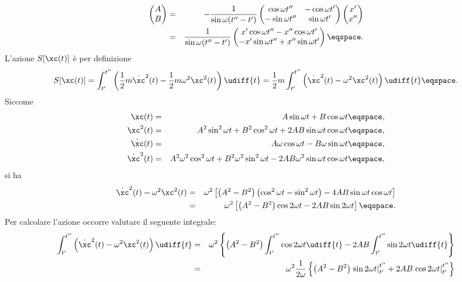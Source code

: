 \begin{eqnarray*}
\begin{pmatrix} A\\B\end{pmatrix} &=& -
\frac{1}{\sin \omega(t''-t')} 
\begin{pmatrix} \cos \omega t'' & - \cos \omega
t' \\ -\sin \omega t'' & \sin \omega t' \end{pmatrix}  \begin{pmatrix} x' \\ x''
\end{pmatrix} \\
&=&
\frac{1}{\sin \omega(t''-t')} 
\begin{pmatrix} 
x' \cos \omega t'' -x'' \cos \omega t' \\
-x' \sin \omega t'' + x'' \sin \omega t'  
\end{pmatrix} \eqspace .
\end{eqnarray*}
L'azione $S[\xc(t)]$ \`e per definizione
\begin{displaymath}
S[\xc(t)] = \int_{t'}^{t''} \left( \frac{1}{2}m \dot{\xc}^{2} (t) - \frac{1}{2}
m \omega^{2}  \xc^{2}(t) \right) \udiff{t} = \frac{1}{2} m \int_{t'}^{t''}
\left( \dot{\xc}^{2} (t) - \omega^{2} \xc^{2}(t) \right) \udiff{t} \eqspace .
\end{displaymath}
Siccome
\begin{eqnarray*}
\xc(t) &=& A \sin \omega t + B \cos \omega t \eqspace, \\
\xc^{2} (t) &=& A^{2} \sin^{2} \omega t + B^{2} \cos^{2} \omega t + 2 A B \sin
\omega  t \cos \omega t \eqspace , \\
\dot{\xc} (t) &=& A \omega \cos \omega t - B \omega \sin \omega t \eqspace, \\
\dot{\xc}^{2}(t) &=& 
A^{2} \omega^{2} \cos^{2} \omega t + B^{2} \omega^{2} \sin^{2} \omega t - 2 AB
\omega^{2} \sin\omega t \cos \omega t  \eqspace, 
\end{eqnarray*}
si ha
\begin{eqnarray*}
\dot{\xc}^{2} (t) - \omega^{2} \xc^{2}(t) 
&=& \omega^{2} \left[ \left( A^{2} - B^{2} \right) \left( \cos^{2} \omega t -
\sin^{2} \omega t \right) - 4 A B \sin \omega t \cos \omega t \right] \\
&=& \omega^{2} \left[ \left( A^{2} - B^{2} \right) \cos 2 \omega t -   
2 A B \sin 2\omega t \right] \eqspace .
\end{eqnarray*}
Per calcolare l'azione occorre valutare  il seguente integrale:
\begin{eqnarray*}
\int_{t'}^{t''} \left( \dot{\xc}^{2} (t) - \omega^{2} \xc^{2}(t) \right)
\udiff{t} &=& 
\omega^{2}  \left\{ \left( A^{2} - B^{2} \right) \int_{t'}^{t''} \cos 2\omega t
\udiff{t}  - 2 AB \int_{t'}^{t''} \sin 2\omega t \udiff{t} \right\}
\\
&=&\omega^{2} \frac{1}{2\omega}  \left\{ \left( A^{2} - B^{2} \right) \left. \sin
2\omega t \right|_{t'}^{t''} + 2 AB \left. \cos 2 \omega t   \right|_{t'}^{t''}
\right\}
\end{eqnarray*}
